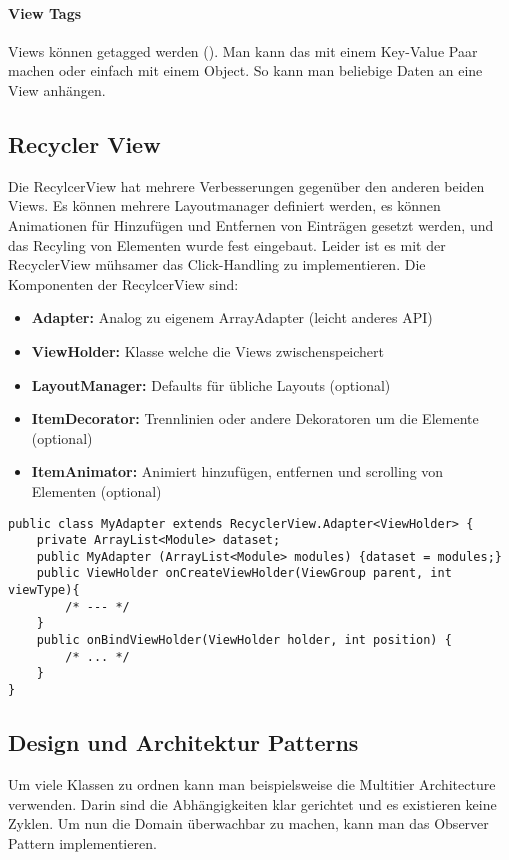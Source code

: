 \paragraph{View Tags} Views können getagged werden (). Man kann das mit einem Key-Value Paar machen oder einfach mit einem Object. So kann man beliebige Daten an eine View anhängen. 
\subsection{Recycler View} 
Die RecylcerView hat mehrere Verbesserungen gegenüber den anderen beiden Views. Es können mehrere Layoutmanager definiert werden, es können Animationen für Hinzufügen und Entfernen von Einträgen gesetzt werden, und das Recyling von Elementen wurde fest eingebaut. Leider ist es mit der RecyclerView mühsamer das Click-Handling zu implementieren. Die Komponenten der RecylcerView sind:
\begin{itemize}
\item \textbf{Adapter:} Analog zu eigenem ArrayAdapter (leicht anderes API)
\item \textbf{ViewHolder:} Klasse welche die Views zwischenspeichert
\item \textbf{LayoutManager:} Defaults für übliche Layouts (optional)
\item \textbf{ItemDecorator:} Trennlinien oder andere Dekoratoren um die Elemente (optional)
\item \textbf{ItemAnimator:} Animiert hinzufügen, entfernen und scrolling von Elementen (optional)
\end{itemize}
\begin{lstlisting}[caption="RecyclerView Schnittstelle"]
public class MyAdapter extends RecyclerView.Adapter<ViewHolder> {
    private ArrayList<Module> dataset;
    public MyAdapter (ArrayList<Module> modules) {dataset = modules;}
    public ViewHolder onCreateViewHolder(ViewGroup parent, int viewType){ 
        /* --- */
    }
    public onBindViewHolder(ViewHolder holder, int position) {
        /* ... */
    }
}
\end{lstlisting}
\subsection{Design und Architektur Patterns}
Um viele Klassen zu ordnen kann man beispielsweise die Multitier Architecture verwenden. Darin sind die Abhängigkeiten klar gerichtet und es existieren keine Zyklen. Um nun die Domain überwachbar zu machen, kann man das Observer Pattern implementieren.
